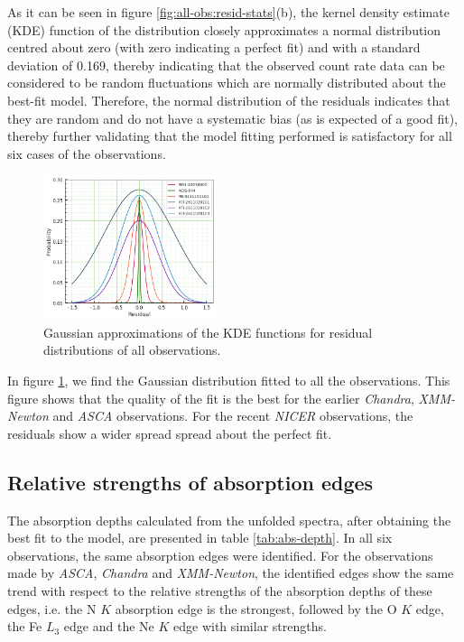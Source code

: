    As it can be seen in figure \ref{fig:all-obs:resid-stats}(b), the kernel density estimate (KDE) function of the distribution closely approximates a normal distribution centred about zero (with zero indicating a perfect fit) and with a standard deviation of 0.169, thereby indicating that the observed count rate data can be considered to be random fluctuations which are normally distributed about the best-fit model. Therefore, the normal distribution of the residuals indicates that they are random and do not have a systematic bias (as is expected of a good fit), thereby further validating that the model fitting performed is satisfactory for all six cases of the observations.
    
    \begin{figure}[!htb]
    	\centering
    	\includegraphics[width=0.45\textwidth]{figures/resid/mr-vel-resid-gaussfit_all-obs.png}
    	\caption{Gaussian approximations of the KDE functions for residual distributions of all observations.}
    	\label{fig:all-obs:resid-gaussfit}
    \end{figure}
    
    In figure \ref{fig:all-obs:resid-gaussfit}, we find the Gaussian distribution fitted to all the observations. This figure shows that the quality of the fit is the best for the earlier \textit{Chandra}, \textit{XMM-Newton} and \textit{ASCA} observations. For the recent \textit{NICER} observations, the residuals show a wider spread spread about the perfect fit.
    
    
	
	\subsection{Relative strengths of absorption edges}
    The absorption depths calculated from the unfolded spectra, after obtaining the best fit to the model, are presented in table \ref{tab:abs-depth}. In all six observations, the same absorption edges were identified. For the observations made by \textit{ASCA}, \textit{Chandra} and \textit{XMM-Newton}, the identified edges show the same trend with respect to the relative strengths of the absorption depths of these edges, i.e. the N $K$ absorption edge is the strongest, followed by the O $K$ edge, the Fe $L_3$ edge and the Ne $K$ edge with similar strengths.
    

